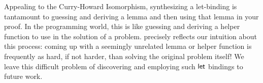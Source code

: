 Appealing to the Curry-Howard Isomorphism, synthesizing a let-binding is tantamount to guessing and deriving a lemma and then using that lemma in your proof.
In the programming world, this is like guessing and deriving a helper function to use in the solution of a problem.
 precisely reflects our intuition about this process: coming up with a seemingly unrelated lemma or helper function is frequently as hard, if not harder, than solving the original problem itself!
We leave this difficult problem of discovering and employing such $\mathsf{let}$ bindings to future work.
